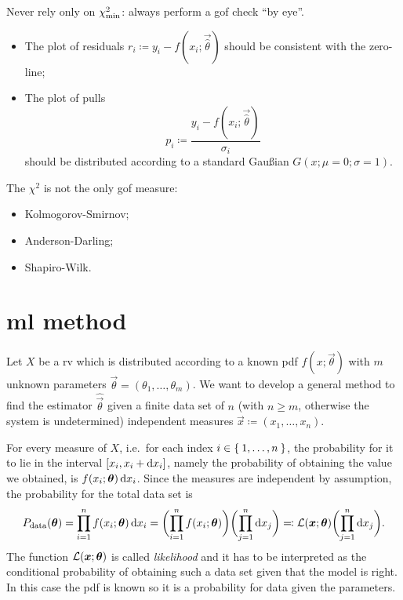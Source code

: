 Never rely only on $\chi^2_\textup{min}$: always perform a \ac{gof} check ``by eye''.
\begin{itemize}
	\item
		The plot of residuals $r_i \coloneqq y_i - f(x_i;\vec{\hat\theta})$ should be consistent with the zero-line;
	\item
		The plot of pulls
		\begin{equation}
			p_i \coloneqq \frac{y_i - f(x_i;\vec{\hat\theta})}{\sigma_i}
		\end{equation}
		should be distributed according to a standard Gau\ss{}ian $G(x;\mu=0;\sigma = 1)$.
\end{itemize}



The $\chi^2$ is not the only \ac{gof} measure:
\begin{itemize}
	\item
		Kolmogorov-Smirnov;
	\item
		Anderson-Darling;
	\item
		Shapiro-Wilk.
\end{itemize}

\section{\acl{ml} method}

Let $X$ be a \ac{rv} which is distributed according to a known \ac{pdf} $f(x;\vec{\theta})$ with $m$ unknown parameters $\vec{\theta} = (\theta_1,\dots,\theta_m)$.
We want to develop a general method to find the estimator $\hat{\vec{\theta}}$ given a finite data set of $n$ (with $n\ge m$, otherwise the system is undetermined) independent measures $\vec{x}\coloneqq (x_1,\dots,x_n)$.


For every measure of $X$, i.e.~for each index $i \in\Set{1,\dots,n}$, the probability for it to lie in the interval $[x_i,x_i+\mathop{}\!\mathrm{d} x_i]$, namely the probability of obtaining the value we obtained, is $f(x_i;\bm{{\theta}})\mathop{}\!\mathrm{d} x_i$.
Since the measures are independent by assumption, the probability for the total data set is
\begin{equation}
	P_\textup{data}(\bm{{\theta}})
	= \prod_{i=1}^n f(x_i;\bm{{\theta}})\mathop{}\!\mathrm{d} x_i
	=\biggl(\prod_{i=1}^n f(x_i;\bm{{\theta}}) \biggr)\biggl(\prod_{j=1}^n \mathop{}\!\mathrm{d} x_j\biggr)
	\eqqcolon \mathcal{L}(\bm{{x}};\bm{{\theta}})\biggl(\prod_{j=1}^n \mathop{}\!\mathrm{d} x_j\biggr).
\end{equation}
The function $\mathcal{L}(\bm{{x}};\bm{{\theta}})$ is called \emph{likelihood} and it has to be interpreted as the conditional probability of obtaining such a data set given that the model is right.
In this case the \ac{pdf} is known so it is a probability for data given the parameters.


